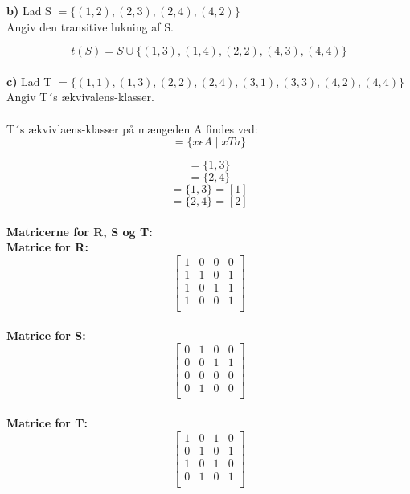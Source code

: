 \documentclass{article}
\begin{document}
\textbf{b)} Lad S \(=\lbrace(1,2), (2,3), (2,4), (4,2)\rbrace\)
\\Angiv den transitive lukning af S.

\begin{displaymath}
t(S) = S \cup \lbrace(1,3), (1,4), (2,2), (4,3), (4,4)\rbrace
\end{displaymath}
\\
\textbf{c)} Lad T \(=\lbrace(1,1), (1,3), (2,2), (2,4), (3,1), (3,3), (4,2), (4,4)\rbrace\)
\\Angiv T´s ækvivalens-klasser.\\
\\
T´s ækvivlaens-klasser på mængeden A findes ved:
\begin{displaymath}
[ a ] = \lbrace x \epsilon A \mid xTa \rbrace
\end{displaymath}

\begin{displaymath}
[1] = \lbrace 1, 3 \rbrace
\end{displaymath}
\begin{displaymath}
[2] = \lbrace 2, 4 \rbrace
\end{displaymath}
\begin{displaymath}
[3] = \lbrace 1, 3 \rbrace = [1]
\end{displaymath}
\begin{displaymath}
[4] = \lbrace 2, 4 \rbrace = [2]
\end{displaymath}
\\
\textbf{Matricerne for R, S og T:}
\\
\textbf{Matrice for R:}
\begin{displaymath}
\begin{bmatrix}
1 & 0 & 0 & 0\\
1 & 1 & 0 & 1\\
1 & 0 & 1 & 1\\
1 & 0 & 0 & 1\\
\end{bmatrix}
\end{displaymath}
\\
\textbf{Matrice for S:}
\begin{displaymath}
\begin{bmatrix}
0 & 1 & 0 & 0\\
0 & 0 & 1 & 1\\
0 & 0 & 0 & 0\\
0 & 1 & 0 & 0\\
\end{bmatrix}
\end{displaymath}\\
\textbf{Matrice for T:}
\begin{displaymath}
\begin{bmatrix}
1 & 0 & 1 & 0\\
0 & 1 & 0 & 1\\
1 & 0 & 1 & 0\\
0 & 1 & 0 & 1\\
\end{bmatrix}
\end{displaymath}
\end{document}
